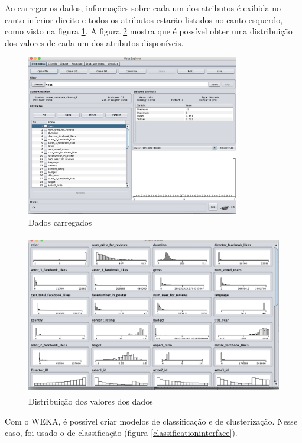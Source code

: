 Ao carregar os dados, informações sobre cada um dos atributos é exibida no canto inferior direito e todos os atributos estarão listados no canto esquerdo, como visto na figura \ref{loadeddata}. A figura \ref{distribuicao} mostra que é possível obter uma distribuição dos valores de cada um dos atributos disponíveis.

\begin{figure}[H]
\centering
\includegraphics[height=7cm]{imagens/wekapreprocessingfull.png}
\caption{Dados carregados}
\label{loadeddata}
\end{figure}

\begin{figure}[H]
\centering
\includegraphics[height=7cm]{imagens/wekadistribuition.png}
\caption{Distribuição dos valores dos dados}
\label{distribuicao}
\end{figure}

Com o WEKA, é possível criar modelos de classificação e de clusterização. Nesse caso, foi usado o de classificação (figura \ref{classificationinterface}).

